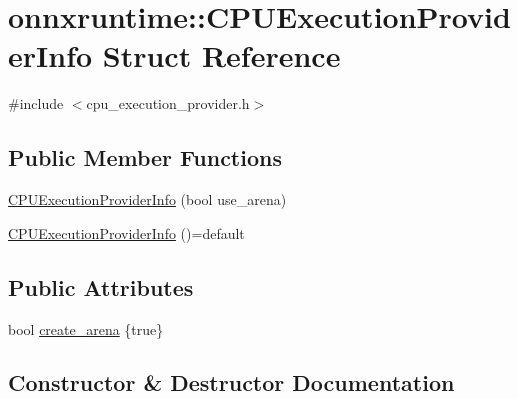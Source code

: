\hypertarget{structonnxruntime_1_1CPUExecutionProviderInfo}{}\section{onnxruntime\+:\+:C\+P\+U\+Execution\+Provider\+Info Struct Reference}
\label{structonnxruntime_1_1CPUExecutionProviderInfo}


{\ttfamily \#include $<$cpu\+\_\+execution\+\_\+provider.\+h$>$}

\subsection*{Public Member Functions}
\begin{DoxyCompactItemize}
\item 
\mbox{\hyperlink{structonnxruntime_1_1CPUExecutionProviderInfo_a85e6739858979db45da80d3f8d885f99}{C\+P\+U\+Execution\+Provider\+Info}} (bool use\+\_\+arena)
\item 
\mbox{\hyperlink{structonnxruntime_1_1CPUExecutionProviderInfo_a18f70d6db3da8af21d1682148bdd638a}{C\+P\+U\+Execution\+Provider\+Info}} ()=default
\end{DoxyCompactItemize}
\subsection*{Public Attributes}
\begin{DoxyCompactItemize}
\item 
bool \mbox{\hyperlink{structonnxruntime_1_1CPUExecutionProviderInfo_afa00451dd7f41da982f190728bd68ef2}{create\+\_\+arena}} \{true\}
\end{DoxyCompactItemize}


\subsection{Constructor \& Destructor Documentation}
\mbox{\label{structonnxruntime_1_1CPUExecutionProviderInfo_a85e6739858979db45da80d3f8d885f99}} 
